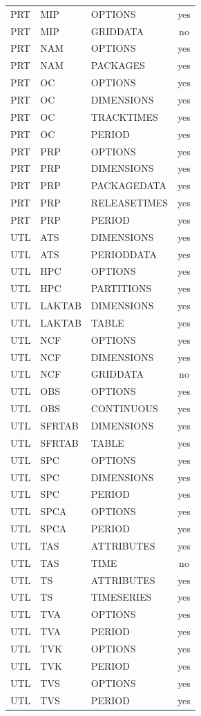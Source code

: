 \begin{longtable}{p{1.5cm} p{1.5cm} p{3cm} c}
\hline
PRT & MIP & OPTIONS & yes \\ 
PRT & MIP & GRIDDATA & no \\ 
\hline
PRT & NAM & OPTIONS & yes \\ 
PRT & NAM & PACKAGES & yes \\ 
\hline
PRT & OC & OPTIONS & yes \\ 
PRT & OC & DIMENSIONS & yes \\ 
PRT & OC & TRACKTIMES & yes \\ 
PRT & OC & PERIOD & yes \\ 
\hline
PRT & PRP & OPTIONS & yes \\ 
PRT & PRP & DIMENSIONS & yes \\ 
PRT & PRP & PACKAGEDATA & yes \\ 
PRT & PRP & RELEASETIMES & yes \\ 
PRT & PRP & PERIOD & yes \\ 
\hline
UTL & ATS & DIMENSIONS & yes \\ 
UTL & ATS & PERIODDATA & yes \\ 
\hline
UTL & HPC & OPTIONS & yes \\ 
UTL & HPC & PARTITIONS & yes \\ 
\hline
UTL & LAKTAB & DIMENSIONS & yes \\ 
UTL & LAKTAB & TABLE & yes \\ 
\hline
UTL & NCF & OPTIONS & yes \\ 
UTL & NCF & DIMENSIONS & yes \\ 
UTL & NCF & GRIDDATA & no \\ 
\hline
UTL & OBS & OPTIONS & yes \\ 
UTL & OBS & CONTINUOUS & yes \\ 
\hline
UTL & SFRTAB & DIMENSIONS & yes \\ 
UTL & SFRTAB & TABLE & yes \\ 
\hline
UTL & SPC & OPTIONS & yes \\ 
UTL & SPC & DIMENSIONS & yes \\ 
UTL & SPC & PERIOD & yes \\ 
\hline
UTL & SPCA & OPTIONS & yes \\ 
UTL & SPCA & PERIOD & yes \\ 
\hline
UTL & TAS & ATTRIBUTES & yes \\ 
UTL & TAS & TIME & no \\ 
\hline
UTL & TS & ATTRIBUTES & yes \\ 
UTL & TS & TIMESERIES & yes \\ 
\hline
UTL & TVA & OPTIONS & yes \\ 
UTL & TVA & PERIOD & yes \\ 
\hline
UTL & TVK & OPTIONS & yes \\ 
UTL & TVK & PERIOD & yes \\ 
\hline
UTL & TVS & OPTIONS & yes \\ 
UTL & TVS & PERIOD & yes \\ 


\hline
\end{longtable}
\label{table:blocks}
\normalsize

